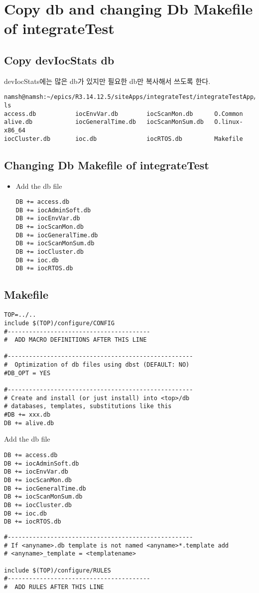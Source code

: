 \documentclass[11pt
  , a4paper
  , article
  , oneside
]{memoir}
\begin{document}
\section{Copy db and changing Db Makefile of integrateTest}
\subsection{Copy devIocStats db}
devIocStats에는 많은 db가 있지만 필요한 db만 복사해서 쓰도록 한다.
\begin{lstlisting}[style=termstyle]
namsh@namsh:~/epics/R3.14.12.5/siteApps/integrateTest/integrateTestApp/Db$ ls
access.db           iocEnvVar.db        iocScanMon.db      O.Common
alive.db            iocGeneralTime.db   iocScanMonSum.db   O.linux-x86_64     
iocCluster.db       ioc.db              iocRTOS.db         Makefile           
\end{lstlisting}
\subsection{Changing Db Makefile of integrateTest}
\begin{itemize}
	\item Add the db file
	\begin{lstlisting}[style=termstyle]
DB += access.db 
DB += iocAdminSoft.db
DB += iocEnvVar.db
DB += iocScanMon.db
DB += iocGeneralTime.db
DB += iocScanMonSum.db
DB += iocCluster.db
DB += ioc.db
DB += iocRTOS.db 
\end{lstlisting}
\end{itemize}
\subsection{Makefile}
\begin{lstlisting}[style=termstyle]
TOP=../..
include $(TOP)/configure/CONFIG
#----------------------------------------
#  ADD MACRO DEFINITIONS AFTER THIS LINE

#----------------------------------------------------
#  Optimization of db files using dbst (DEFAULT: NO)
#DB_OPT = YES

#----------------------------------------------------
# Create and install (or just install) into <top>/db
# databases, templates, substitutions like this
#DB += xxx.db
DB += alive.db
\end{lstlisting}
Add the db file
\begin{lstlisting}[style=termstyle]
DB += access.db 
DB += iocAdminSoft.db
DB += iocEnvVar.db
DB += iocScanMon.db
DB += iocGeneralTime.db
DB += iocScanMonSum.db
DB += iocCluster.db
DB += ioc.db
DB += iocRTOS.db
\end{lstlisting}
\begin{lstlisting}[style=termstyle]
#----------------------------------------------------
# If <anyname>.db template is not named <anyname>*.template add
# <anyname>_template = <templatename>

include $(TOP)/configure/RULES
#----------------------------------------
#  ADD RULES AFTER THIS LINE
\end{lstlisting}
\end{document}
